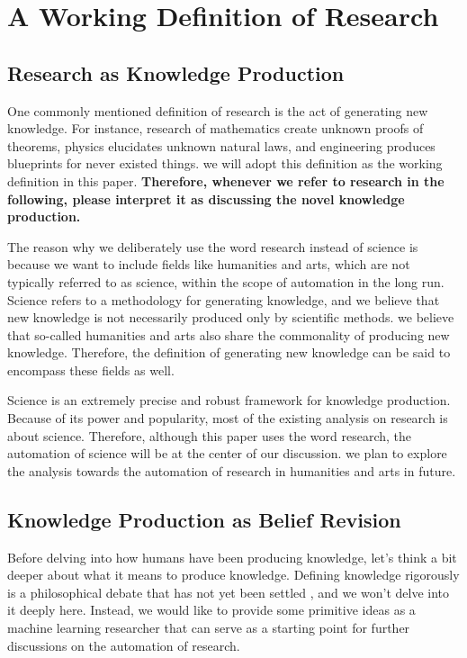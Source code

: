 \documentclass{book}
\begin{document}
\section{A Working Definition of Research}

\subsection{Research as Knowledge Production}

One commonly mentioned definition of research is the act of generating new knowledge. For instance, research of mathematics create unknown proofs of theorems, physics elucidates unknown natural laws, and engineering produces blueprints for never existed things. we will adopt this definition as the working definition in this paper. \textbf{Therefore, whenever we refer to research in the following, please interpret it as discussing the novel knowledge production.}

The reason why we deliberately use the word research instead of science is because we want to include fields like humanities and arts, which are not typically referred to as science, within the scope of automation in the long run. Science refers to a methodology for generating knowledge, and we believe that new knowledge is not necessarily produced only by scientific methods. we believe that so-called humanities and arts also share the commonality of producing new knowledge. Therefore, the definition of generating new knowledge can be said to encompass these fields as well.

Science is an extremely precise and robust  framework for knowledge production. Because of its power and popularity, most of the existing analysis on research is about science. Therefore, although this paper uses the word research, the automation of science will be at the center of our discussion. we plan to explore the analysis towards the automation of research in humanities and arts in future.

\subsection{Knowledge Production as Belief Revision}
Before delving into how humans have been producing knowledge, let's think a bit deeper about what it means to produce knowledge. Defining knowledge rigorously is a philosophical debate that has not yet been settled \cite{sep-epistemology}, and we won't delve into it deeply here. Instead, we would like to provide some primitive ideas as a machine learning researcher that can serve as a starting point for further discussions on the automation of research.
\end{document}
